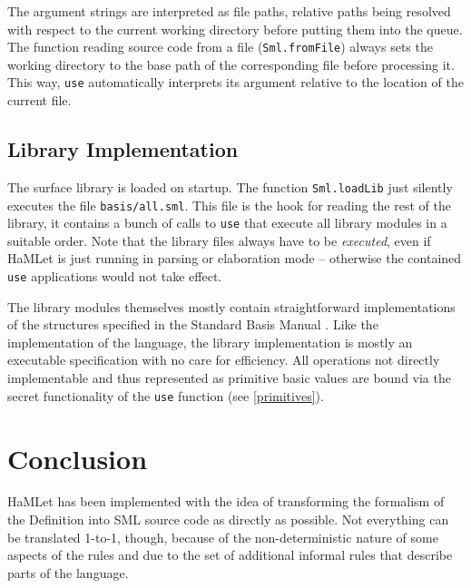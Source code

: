 \documentclass[twoside,titlepage]{article}
\newcommand{\void}[1]{}
\begin{document}
The argument strings are interpreted as file paths, relative paths being resolved with respect to the current working directory before putting them into the queue. The function reading source code from a file ({\tt Sml.fromFile}) always sets the working directory to the base path of the corresponding file before processing it. This way, {\tt use} automatically interprets its argument relative to the location of the current file.


\subsection{Library Implementation}
\label{basis}

The surface library is loaded on startup\void{ (or during built in the case of SML/NJ)}. The function {\tt Sml.loadLib} just silently executes the file {\tt basis/all.sml}. This file is the hook for reading the rest of the library, it contains a bunch of calls to {\tt use} that execute all library modules in a suitable order. Note that the library files always have to be {\em executed}, even if HaMLet is just running in parsing or elaboration mode -- otherwise the contained {\tt use} applications would not take effect.

The library modules themselves mostly contain straightforward implementations of the structures specified in the Standard Basis Manual \cite{basis}. Like the implementation of the language, the library implementation is mostly an executable specification with no care for efficiency. All operations not directly implementable and thus represented as primitive basic values are bound via the secret functionality of the {\tt use} function (see \ref{primitives}).



\section{Conclusion}
\label{conclusion}

HaMLet has been implemented with the idea of transforming the formalism of the Definition into SML source code as directly as possible. Not everything can be translated 1-to-1, though, because of the non-deterministic nature of some aspects of the rules and due to the set of additional informal rules that describe parts of the language.
\end{document}
